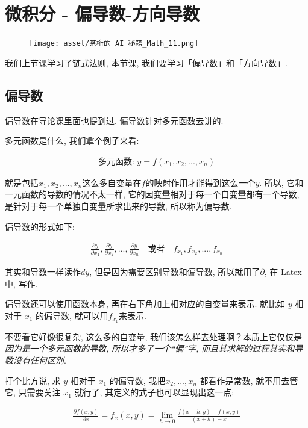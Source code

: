 \chapter{微积分 - 偏导数-方向导数}

\begin{figure}[ht]
  \centering
  \texttt{[image: asset/茶桁的 AI 秘籍\_Math\_11.png]}
\end{figure}

\newpage

我们上节课学习了链式法则, 本节课, 我们要学习「偏导数」和「方向导数」. 

\section{偏导数}

偏导数在导论课里面也提到过. 偏导数针对多元函数去讲的. 

多元函数是什么, 我们拿个例子来看: 

\begin{align*}
  \mbox{多元函数: }y = f(x_1, x_2, ..., x_n)
\end{align*}

就是包括$x_1,  x_2,  ...,  x_n$这么多自变量在$f$的映射作用才能得到这么一个$y$. 所以, 它和一元函数的导数的情况不太一样, 它的因变量相对于每一个自变量都有一个导数, 是针对于每一个单独自变量所求出来的导数, 所以称为偏导数. 

偏导数的形式如下: 

\begin{align*}
  \frac{\partial y}{\partial x_1},  \frac{\partial y}{\partial x_2},  ...,  \frac{\partial y}{\partial x_n} \quad \mbox{或者} \quad f_{x_1},  f_{x_2},  ...,  f_{x_n}
\end{align*}

其实和导数一样读作\(dy\),  但是因为需要区别导数和偏导数, 所以就用了\(\partial\), 在 Latex 中, 写作\pyth{\partial}.

偏导数还可以使用函数本身, 再在右下角加上相对应的自变量来表示. 就比如 $y$ 相对于 $x_1$ 的偏导数, 就可以用$f_{x_1}$来表示. 

不要看它好像很复杂, 这么多的自变量, 我们该怎么样去处理啊？本质上它仅仅是\textit{因为是一个多元函数的导数, 所以才多了一个“偏”字, 而且其求解的过程其实和导数没有任何区别}. 

打个比方说, 求 $y$ 相对于 $x_1$ 的偏导数, 我把$x_2, ..., x_n$ 都看作是常数, 就不用去管它, 只需要关注 $x_1$ 就行了, 其定义的式子也可以显现出这一点: 

\begin{align*}
  \frac{\partial f(x, y)}{\partial x}  = f_x(x, y) = \lim_{h \to 0} \frac{f(x+h, y) - f(x, y)}{(x+h)-x}
\end{align*}

